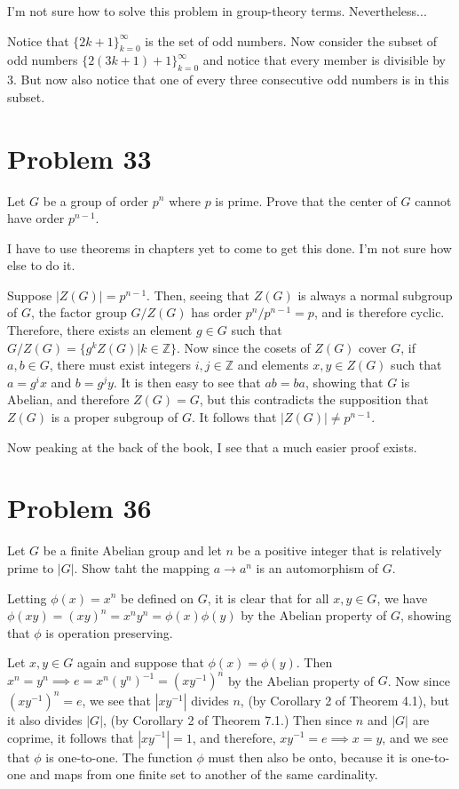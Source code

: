 \documentclass[12pt]{article}
\newcommand{\Z}{\mathbb{Z}}
\begin{document}
I'm not sure how to solve this problem in group-theory terms.  Nevertheless...

Notice that $\{2k+1\}_{k=0}^\infty$ is the set of odd numbers.
Now consider the subset of odd numbers $\{2(3k+1)+1\}_{k=0}^\infty$
and notice that every member is divisible by 3.  But now also notice that
one of every three consecutive odd numbers is in this subset.

\section*{Problem 33}

Let $G$ be a group of order $p^n$ where $p$ is prime.  Prove that the center of
$G$ cannot have order $p^{n-1}$.

I have to use theorems in chapters yet to come to get this done.  I'm not sure
how else to do it.

Suppose $|Z(G)|=p^{n-1}$.  Then, seeing that $Z(G)$ is always
a normal subgroup of $G$, the factor group $G/Z(G)$ has
order $p^n/p^{n-1}=p$, and is therefore cyclic.
Therefore, there exists an element $g\in G$ such that $G/Z(G)=\{g^kZ(G)|k\in\Z\}$.
Now since the cosets of $Z(G)$ cover $G$, if $a,b\in G$, there must exist integers $i,j\in\Z$
and elements $x,y\in Z(G)$ such that $a=g^ix$ and $b=g^jy$.
It is then easy to see that $ab=ba$, showing that $G$ is
Abelian, and therefore $Z(G)=G$, but this contradicts the supposition that $Z(G)$ is a proper
subgroup of $G$.  It follows that $|Z(G)|\neq p^{n-1}$.

Now peaking at the back of the book, I see that a much easier
proof exists.

\section*{Problem 36}

Let $G$ be a finite Abelian group and let $n$ be a positive integer that is relatively prime to $|G|$.
Show taht the mapping $a\to a^n$ is an automorphism of $G$.

Letting $\phi(x)=x^n$ be defined on $G$, it is clear that for all $x,y\in G$,
we have $\phi(xy)=(xy)^n=x^ny^n=\phi(x)\phi(y)$ by the Abelian property
of $G$, showing that $\phi$ is operation preserving.

Let $x,y\in G$ again and suppose that $\phi(x)=\phi(y)$.
Then $x^n=y^n\implies e=x^n(y^n)^{-1}=(xy^{-1})^n$
by the Abelian property of $G$.  Now since $(xy^{-1})^n=e$,
we see that $|xy^{-1}|$ divides $n$, (by Corollary 2 of Theorem 4.1), but it also divides $|G|$, (by
Corollary 2 of Theorem 7.1.)
Then since $n$ and $|G|$ are coprime, it follows that $|xy^{-1}|=1$,
and therefore, $xy^{-1}=e\implies x=y$, and we see that
$\phi$ is one-to-one.  The function $\phi$ must then also be onto,
because it is one-to-one and maps from one finite set to another
of the same cardinality.
\end{document}
